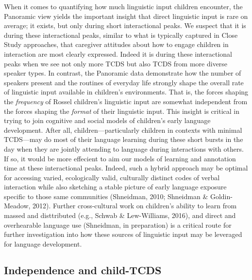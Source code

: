 \documentclass[,man,floatsintext]{apa6}
\begin{document}
When it comes to quantifying how much linguistic input children
encounter, the Panoramic view yields the important insight that direct
linguistic input is rare on average; it exists, but only during short
interactional peaks. We suspect that it is during these interactional
peaks, similar to what is typically captured in Close Study approaches,
that caregiver attitudes about how to engage children in interaction are
most clearly expressed. Indeed it is during these interactional peaks
when we see not only more TCDS but also TCDS from more diverse speaker
types. In contrast, the Panoramic data demonstrate how the number of
speakers present and the routines of everyday life strongly shape the
overall rate of linguistic input available in children's environments.
That is, the forces shaping the \emph{frequency} of Rossel children's
linguistic input are somewhat independent from the forces shaping the
\emph{format} of their linguistic input. This insight is critical in
trying to join cognitive and social models of children's early language
development. After all, children---particularly children in contexts
with minimal TCDS---may do most of their language learning during these
short bursts in the day when they are jointly attending to language
during interactions with others. If so, it would be more effecient to
aim our models of learning and annotation time at these interactional
peaks. Indeed, such a hybrid approach may be optimal for accessing
varied, ecologically valid, culturally distinct codes of verbal
interaction while also sketching a stable picture of early language
exposure specific to those same communities (Shneidman, 2010; Shneidman
\& Goldin-Meadow, 2012). Further cross-cultural work on children's
ability to learn from massed and disttributed (e.g., Schwab \&
Lew-Williams, 2016), and direct and overhearable language use
(Shneidman, in preparation) is a critical route for further
investigation into how these sources of linguistic input may be
leveraged for language development.

\subsection{Independence and
child-TCDS}\label{independence-and-child-tcds}
\end{document}
